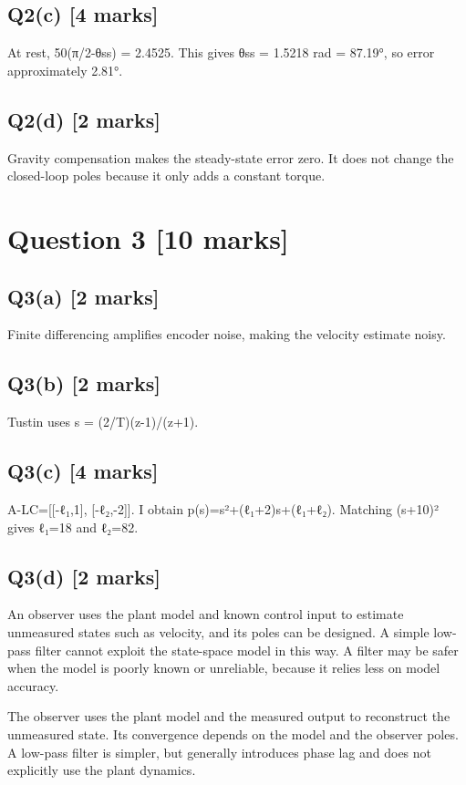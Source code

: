 \documentclass[11pt,a4paper]{article}
\begin{document}
\subsection*{Q2(c) \hfill [4 marks]}

At rest, 50(π/2-θss) = 2.4525.
This gives θss = 1.5218 rad = 87.19°, so error approximately 2.81°.

\subsection*{Q2(d) \hfill [2 marks]}

Gravity compensation makes the steady-state error zero.
It does not change the closed-loop poles because it only adds a constant torque.

\section*{Question 3 \hfill [10 marks]}
\subsection*{Q3(a) \hfill [2 marks]}

Finite differencing amplifies encoder noise, making the velocity estimate noisy.

\subsection*{Q3(b) \hfill [2 marks]}

Tustin uses s = (2/T)(z-1)/(z+1).

\subsection*{Q3(c) \hfill [4 marks]}

A-LC=[[-ℓ₁,1], [-ℓ₂,-2]].
I obtain p(s)=s²+(ℓ₁+2)s+(ℓ₁+ℓ₂).
Matching (s+10)² gives ℓ₁=18 and ℓ₂=82.

\subsection*{Q3(d) \hfill [2 marks]}

An observer uses the plant model and known control input to estimate unmeasured states such as velocity, and its poles can be designed.
A simple low-pass filter cannot exploit the state-space model in this way.
A filter may be safer when the model is poorly known or unreliable, because it relies less on model accuracy.\par\smallskip The observer uses the plant model and the measured output to reconstruct the unmeasured state. Its convergence depends on the model and the observer poles. A low-pass filter is simpler, but generally introduces phase lag and does not explicitly use the plant dynamics.
\end{document}
